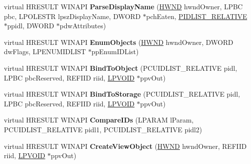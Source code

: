 \begin{DoxyCompactItemize}
\item 
\mbox{\label{class_c_fonts_folder_a147d1168a01cda6873e2d358d4d57aca}} 
virtual H\+R\+E\+S\+U\+LT W\+I\+N\+A\+PI {\bfseries Parse\+Display\+Name} (\hyperlink{interfacevoid}{H\+W\+ND} hwnd\+Owner, L\+P\+BC pbc, L\+P\+O\+L\+E\+S\+TR lpsz\+Display\+Name, D\+W\+O\+RD $\ast$pch\+Eaten, \hyperlink{struct___i_t_e_m_i_d_l_i_s_t___r_e_l_a_t_i_v_e}{P\+I\+D\+L\+I\+S\+T\+\_\+\+R\+E\+L\+A\+T\+I\+VE} $\ast$ppidl, D\+W\+O\+RD $\ast$pdw\+Attributes)
\item 
\mbox{\label{class_c_fonts_folder_a06ab8fc0da8292f6de6c390461f1ee83}} 
virtual H\+R\+E\+S\+U\+LT W\+I\+N\+A\+PI {\bfseries Enum\+Objects} (\hyperlink{interfacevoid}{H\+W\+ND} hwnd\+Owner, D\+W\+O\+RD dw\+Flags, L\+P\+E\+N\+U\+M\+I\+D\+L\+I\+ST $\ast$pp\+Enum\+I\+D\+List)
\item 
\mbox{\label{class_c_fonts_folder_a5fb527a88ba69193973238d5753b99bc}} 
virtual H\+R\+E\+S\+U\+LT W\+I\+N\+A\+PI {\bfseries Bind\+To\+Object} (P\+C\+U\+I\+D\+L\+I\+S\+T\+\_\+\+R\+E\+L\+A\+T\+I\+VE pidl, L\+P\+BC pbc\+Reserved, R\+E\+F\+I\+ID riid, \hyperlink{interfacevoid}{L\+P\+V\+O\+ID} $\ast$ppv\+Out)
\item 
\mbox{\label{class_c_fonts_folder_a3cfda23d3fa5e24261a3a770c58ec9bb}} 
virtual H\+R\+E\+S\+U\+LT W\+I\+N\+A\+PI {\bfseries Bind\+To\+Storage} (P\+C\+U\+I\+D\+L\+I\+S\+T\+\_\+\+R\+E\+L\+A\+T\+I\+VE pidl, L\+P\+BC pbc\+Reserved, R\+E\+F\+I\+ID riid, \hyperlink{interfacevoid}{L\+P\+V\+O\+ID} $\ast$ppv\+Out)
\item 
\mbox{\label{class_c_fonts_folder_a0ff3e37095457ef3391d48702d2c0199}} 
virtual H\+R\+E\+S\+U\+LT W\+I\+N\+A\+PI {\bfseries Compare\+I\+Ds} (L\+P\+A\+R\+AM l\+Param, P\+C\+U\+I\+D\+L\+I\+S\+T\+\_\+\+R\+E\+L\+A\+T\+I\+VE pidl1, P\+C\+U\+I\+D\+L\+I\+S\+T\+\_\+\+R\+E\+L\+A\+T\+I\+VE pidl2)
\item 
\mbox{\label{class_c_fonts_folder_a234c3a943804802ace9de6411e30c781}} 
virtual H\+R\+E\+S\+U\+LT W\+I\+N\+A\+PI {\bfseries Create\+View\+Object} (\hyperlink{interfacevoid}{H\+W\+ND} hwnd\+Owner, R\+E\+F\+I\+ID riid, \hyperlink{interfacevoid}{L\+P\+V\+O\+ID} $\ast$ppv\+Out)

\end{DoxyCompactItemize}
